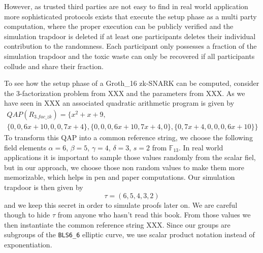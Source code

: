 However, as trusted third parties are not easy to find in real world application more sophisticated protocols exists that execute the setup phase as a multi party computation, where the proper execution can be publicly verified and the simulation trapdoor is deleted if at least one participants deletes their individual contribution to the randomness. Each participant only possesses a fraction of the simulation trapdoor and the toxic waste can only be recovered if all participants collude and share their fraction.
\begin{example} To see how the setup phase of a Groth\_16 zk-SNARK can be computed, consider the $3$-factorization problem from XXX and the parameters from XXX. As we have seen in XXX an associated quadratic arithmetic program is given by
\begin{multline*}
QAP(R_{3.fac\_zk}) =\{x^{2}+x+9,\\
 \{0,0,6x+10,0,0,7x+4\},\{0,0,0,6x+10,7x+4,0\},\{0,7x+4,0,0,0,6x+10\}\}
\end{multline*}
To transform this QAP into a common reference string, we choose the following field elements $\alpha=6$, $\beta=5$, $\gamma=4$, $\delta=3$, $s=2$ from $\mathbb{F}_{13}$. 
In real world applications it is important to sample those values randomly from the scalar fiel, but in our approach, we choose those non random values to make them more memorizable, which helps in pen and paper computations. Our simulation trapdoor is then given by
$$
\tau = (6,5,4,3,2)
$$
and we keep this secret in order to simulate proofs later on. We are careful though to hide $\tau$ from anyone who hasn't read this book. From those values we then instantiate the common reference string XXX. Since our groups are subgroups of the \texttt{BLS6\_6} elliptic curve, we use scalar product notation instead of exponentiation. 


\end{example}
